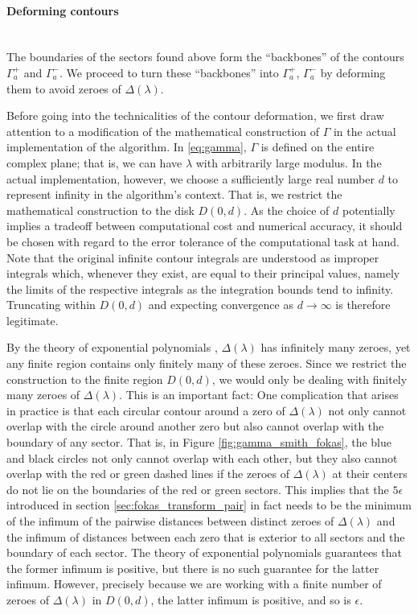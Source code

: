 \documentclass[11pt, oneside, a4paper]{article}
\begin{document}
\paragraph{Deforming contours}\mbox{}\\
The boundaries of the sectors found above form the ``backbones'' of the contours $\Gamma_a^+$ and $\Gamma_a^-$. We proceed to turn these ``backbones'' into $\Gamma_a^+$, $\Gamma_a^-$ by deforming them to avoid zeroes of $\Delta(\lambda)$. 

Before going into the technicalities of the contour deformation, we first draw attention to a modification of the mathematical construction of $\Gamma$ in the actual implementation of the algorithm. In \eqref{eq:gamma}, $\Gamma$ is defined on the entire complex plane; that is, we can have $\lambda$ with arbitrarily large modulus. In the actual implementation, however, we choose a sufficiently large real number $d$ to represent infinity in the algorithm's context. That is, we restrict the mathematical construction to the disk $D(0, d)$. As the choice of $d$ potentially implies a tradeoff between computational cost and numerical accuracy, it should be chosen with regard to the error tolerance of the computational task at hand. Note that the original infinite contour integrals are understood as improper integrals which, whenever they exist, are equal to their principal values, namely the limits of the respective integrals as the integration bounds tend to infinity. Truncating within $D(0,d)$ and expecting convergence as $d\to\infty$ is therefore legitimate.

By the theory of exponential polynomials \cite{Langer1931}, $\Delta(\lambda)$ has infinitely many zeroes, yet any finite region contains only finitely many of these zeroes. Since we restrict the construction to the finite region $D(0, d)$, we would only be dealing with finitely many zeroes of $\Delta(\lambda)$. This is an important fact: One complication that arises in practice is that each circular contour around a zero of $\Delta(\lambda)$ not only cannot overlap with the circle around another zero but also cannot overlap with the boundary of any sector. That is, in Figure \ref{fig:gamma_smith_fokas}, the blue and black circles not only cannot overlap with each other, but they also cannot overlap with the red or green dashed lines if the zeroes of $\Delta(\lambda)$ at their centers do not lie on the boundaries of the red or green sectors. This implies that the $5\epsilon$ introduced in section \ref{sec:fokas_transform_pair} in fact needs to be the minimum of the infimum of the pairwise distances between distinct zeroes of $\Delta(\lambda)$ and the infimum of distances between each zero that is exterior to all sectors and the boundary of each sector. The theory of exponential polynomials \cite{Langer1931} guarantees that the former infimum is positive, but there is no such guarantee for the latter infimum. However, precisely because we are working with a finite number of zeroes of $\Delta(\lambda)$ in $D(0, d)$, the latter infimum is positive, and so is $\epsilon$. 
\end{document}
